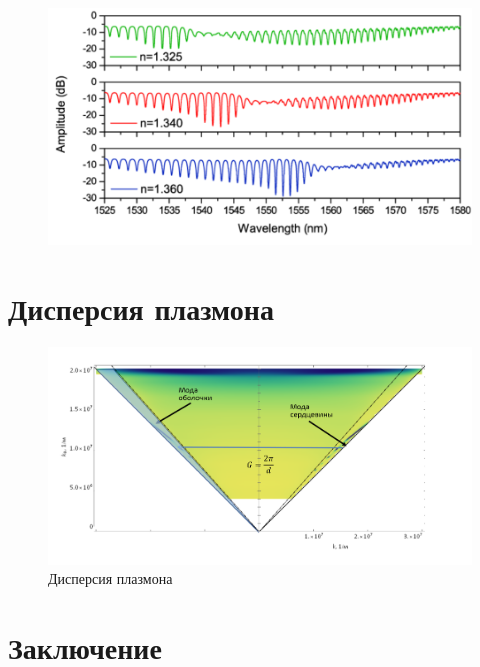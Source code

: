 \documentclass[t]{beamer}  %
\begin{document}
\begin{frame}
\begin{figure}
		\centering
		\includegraphics[width=0.7\linewidth]{screenshot002}
		\caption{}
		\label{fig:screenshot002}
\end{figure}
	

\end{frame}

\section{Дисперсия плазмона}
\begin{frame}
	
	\begin{figure}
		\centering
		\includegraphics[width=1.0\linewidth]{screenshot003}
		\caption{Дисперсия плазмона}
		\label{fig:screenshot003}
	\end{figure}
	
	
\end{frame}	
\section{Заключение}
\begin{frame}
	
\end{frame}	
\end{document}
